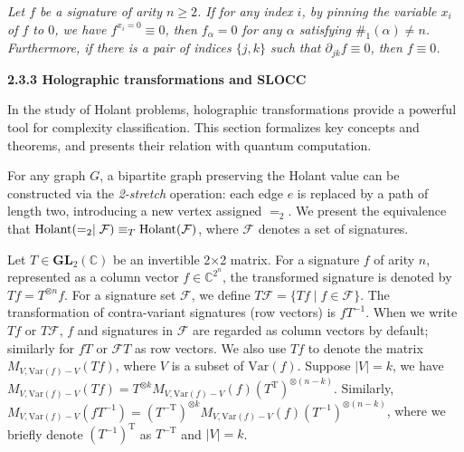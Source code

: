 \documentclass[10pt,a4paper]{article}
\begin{document}
{\itshape Let $f$ be a signature of arity $n\geq 2$. If for any index $i$, by pinning the variable $x_{i}$ of $f$ to $0$, we have $f^{x_{i}=0}\equiv 0$, then $f_{\alpha}=0$ for any $\alpha$ satisfying $\#_{1}(\alpha)\neq n$. Furthermore, if there is a pair of indices $\{j,k\}$ such that $\partial_{jk}f\equiv 0$, then $f\equiv 0$.}\par







\par\medskip\noindent\textbf{
2.3.3 Holographic transformations and SLOCC}\par




In the study of Holant problems, holographic transformations provide a powerful tool for complexity classification. This section formalizes key concepts and theorems, and presents their relation with quantum computation.\par




For any graph $G$, a bipartite graph preserving the Holant value can be constructed via the \emph{2-stretch} operation: each edge $e$ is replaced by a path of length two, introducing a new vertex assigned $=_{2}$. We present the equivalence that $\textup{{Holant}}(=_{2}\mid\mathcal{F})\equiv_{T}\textup{{Holant}}(\mathcal{F})$, where $\mathcal{F}$ denotes a set of signatures.\par




Let $T\in\mathbf{GL}_{2}(\mathbb{C})$ be an invertible 2×2 matrix. For a signature $f$ of arity $n$, represented as a column vector $f\in\mathbb{C}^{2^{n}}$, the transformed signature is denoted by $Tf=T^{\otimes n}f$. For a signature set $\mathcal{F}$, we define $T\mathcal{F}=\{Tf\mid f\in\mathcal{F}\}$. The transformation of contra-variant signatures (row vectors) is $fT^{-1}$. When we write $Tf$ or $T\mathcal{F}$, $f$ and signatures in $\mathcal{F}$ are regarded as column vectors by default; similarly for $fT$ or $\mathcal{F}T$ as row vectors. We also use $Tf$ to denote the matrix $M_{V,\text{Var}(f)-V}(Tf)$, where $V$ is a subset of $\text{Var}(f)$. Suppose $|V|=k$, we have $M_{V,\text{Var}(f)-V}(Tf)=T^{\otimes k}M_{V,\text{Var}(f)-V}(f)\left(T^{\mathrm{T}}\right)^{\otimes(n-k)}$. Similarly, $M_{V,\text{Var}(f)-V}\left(fT^{-1}\right)=\left(T^{-\mathrm{T}}\right)^{\otimes k}M_{V,\text{Var}(f)-V}(f)\left(T^{-1}\right)^{\otimes(n-k)}$, where we briefly denote $(T^{-1})^{\mathrm{T}}$ as $T^{-\mathrm{T}}$ and $|V|=k$.\par
\end{document}
